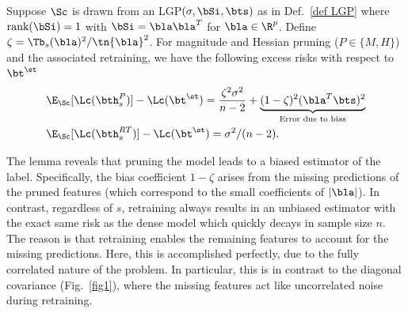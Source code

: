 \begin{lemma} \label{lem rank one}Suppose $\Sc$ is drawn from an LGP$(\sigma,\bSi,\bts)$ as in Def.~\ref{def LGP} where $\text{rank}(\bSi)=1$ with $\bSi=\bla\bla^T$ for $\bla\in\R^p$. Define $\zeta=\Tb_s(\bla)^2/\tn{\bla}^2$. For magnitude and Hessian pruning ($P\in\{M,H\}$) and the associated retraining, we have the following excess risks with respect to $\bt^\st$%
\begin{align}%
&\E_{\Sc}[\Lc(\bth_s^P)]-\Lc(\bt^\st)={\frac{\zeta^2\sigma^2}{n-2}}+\underbrace{(1-\zeta)^2(\bla^T\bts)^2}_{\text{Error due to bias}}\\
&\E_{\Sc}[\Lc(\bth_s^{RT})]-\Lc(\bt^\st)={\sigma^2}/({n-2}).
\end{align}
\end{lemma}
The lemma reveals that pruning the model leads to a biased estimator of the label. Specifically, the bias coefficient $1-\zeta$ arises from the missing predictions of the pruned features (which correspond to the small coefficients of $|\bla|$). In contrast, regardless of $s$, retraining always results in an unbiased estimator with the exact same risk as the dense model which quickly decays in sample size $n$. The reason is that retraining enables the remaining features to account for the missing predictions. Here, this is accomplished perfectly, due to the fully correlated nature of the problem. {In particular, this is in contrast to the diagonal covariance (Fig.~\ref{fig1}), where the missing features act like uncorrelated noise during retraining.} %
